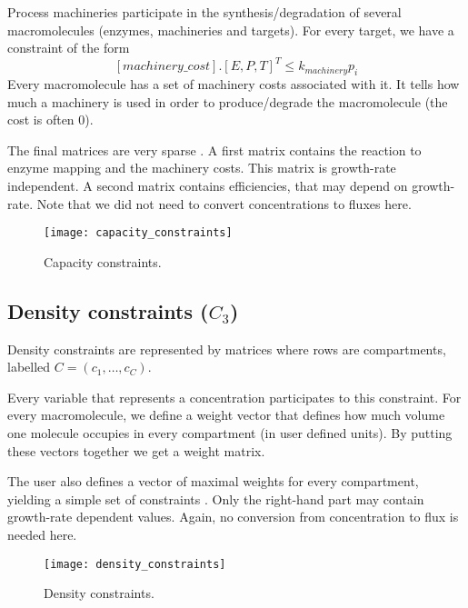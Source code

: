 Process machineries participate in the synthesis/degradation of several
macromolecules (enzymes, machineries and targets).
For every target, we have a constraint of the form
\[
   [machinery\_cost].[E, P, T]^T \leq k_{machinery} p_i
\]
Every macromolecule has a set of machinery costs associated with it.
It tells how much a machinery is used in order to produce/degrade the
macromolecule (the cost is often 0).

The final matrices are very sparse .
A first matrix contains the reaction to enzyme mapping and the machinery
costs. This matrix is growth-rate independent.
A second matrix contains efficiencies, that may depend on growth-rate.
Note that we did not need to convert concentrations to fluxes here.

\begin{figure}
  \centering
  \texttt{[image: capacity\_constraints]}
  \caption{Capacity constraints.}
  \label{fig:capacity_constraints}
\end{figure}

\subsection{Density constraints ($C_3$)}

Density constraints are represented by matrices where rows are compartments,
labelled $C = (c_1, \ldots, c_C)$.

Every variable that represents a concentration participates to this constraint.
For every macromolecule, we define a weight vector that defines how much
volume one molecule occupies in every compartment (in user defined units).
By putting these vectors together we get a weight matrix.

The user also defines a vector of maximal weights for every compartment,
yielding a simple set of constraints .
Only the right-hand part may contain growth-rate dependent values.
Again, no conversion from concentration to flux is needed here.

\begin{figure}
  \centering
  \texttt{[image: density\_constraints]}
  \caption{Density constraints.}
  \label{fig:density_constraints}
\end{figure}
